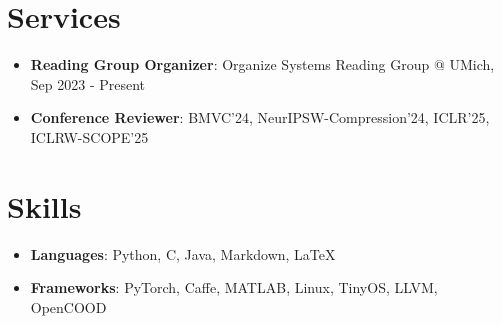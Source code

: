 \documentclass[letterpaper,oneside,11pt]{article}
\newcommand{\resumeItem}[2]{
  \item\small{
    \textbf{#1}{: #2 \vspace{-2pt}}
  }
}
\newcommand{\resumeSubHeadingListStart}{\begin{itemize}[leftmargin=*]}
\newcommand{\resumeSubHeadingListEnd}{\end{itemize}}
\begin{document}
\section{Services}
\resumeSubHeadingListStart
  \resumeItem{Reading Group Organizer}{Organize Systems Reading Group @ UMich, Sep 2023 - Present}
  \resumeItem{Conference Reviewer}{BMVC'24, NeurIPSW-Compression'24, ICLR'25, ICLRW-SCOPE'25}
\resumeSubHeadingListEnd





\section{Skills}
 \resumeSubHeadingListStart
   \resumeItem{Languages}{Python, C, Java, Markdown, \LaTeX}
   \resumeItem{Frameworks}{PyTorch, Caffe, MATLAB, Linux, TinyOS, LLVM, OpenCOOD}
 \resumeSubHeadingListEnd
\end{document}
